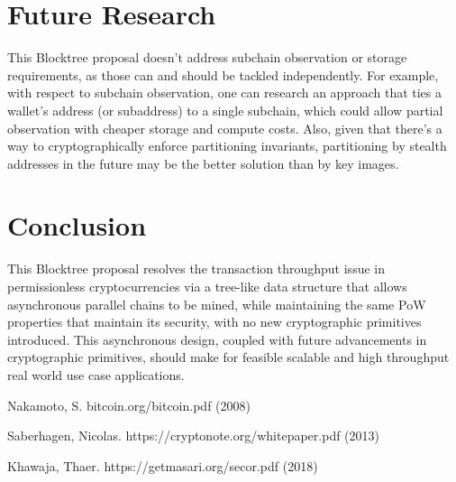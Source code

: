 \documentclass{article}
\begin{document}
\section{Future Research}
This Blocktree proposal doesn't address subchain observation or storage requirements, as those can and should be tackled independently. For example, with respect to subchain observation, one can research an approach that ties a wallet's address (or subaddress) to a single subchain, which could allow partial observation with cheaper storage and compute costs. Also, given that there's a way to cryptographically enforce partitioning invariants, partitioning by stealth addresses in the future may be the better solution than by key images.
\section{Conclusion}
This Blocktree proposal resolves the transaction throughput issue in permissionless cryptocurrencies via a tree-like data structure that allows asynchronous parallel chains to be mined, while maintaining the same PoW properties that maintain its security, with no new cryptographic primitives introduced. This asynchronous design, coupled with future advancements in cryptographic primitives, should make for feasible scalable and high throughput real world use case applications.

\begin{thebibliography}{999}
  Nakamoto, S.
  \newblock bitcoin.org/bitcoin.pdf (2008)

  Saberhagen, Nicolas.
  \newblock https://cryptonote.org/whitepaper.pdf (2013)

  Khawaja, Thaer.
  \newblock https://getmasari.org/secor.pdf (2018)
\end{thebibliography}
\end{document}
